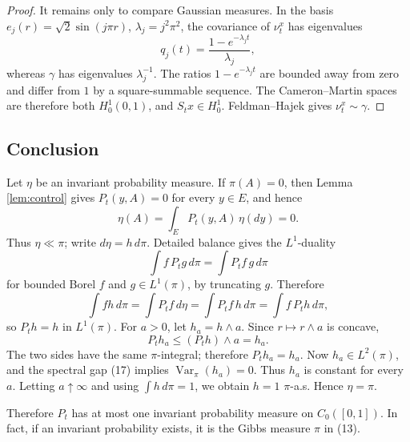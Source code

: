 \documentclass[12pt]{article}
\newcommand{\1}{\mathbf 1}
\newcommand{\Var}{\operatorname{Var}}
\begin{document}
\begin{proof}
It remains only to compare Gaussian measures.  In the basis
\(e_j(r)=\sqrt2\sin(j\pi r)\), \(\lambda_j=j^2\pi^2\), the covariance of
\(\nu_t^x\) has eigenvalues
\[
        q_j(t)=\frac{1-e^{-\lambda_jt}}{\lambda_j},
\]
whereas \(\gamma\) has eigenvalues \(\lambda_j^{-1}\).  The ratios
\(1-e^{-\lambda_jt}\) are bounded away from zero and differ from \(1\) by a
square-summable sequence.  The Cameron--Martin spaces are therefore both
\(H^1_0(0,1)\), and \(S_tx\in H^1_0\).  Feldman--Hajek gives
\(\nu_t^x\sim\gamma\).
\end{proof}

\subsection*{Conclusion}

Let \(\eta\) be an invariant probability measure.  If \(\pi(A)=0\), then
Lemma \ref{lem:control} gives \(P_t(y,A)=0\) for every \(y\in E\), and hence
\[
        \eta(A)=\int_E P_t(y,A)\,\eta(dy)=0.
\]
Thus \(\eta\ll\pi\); write \(d\eta=h\,d\pi\).  Detailed balance gives the
\(L^1\)-duality
\[
        \int f\,P_t g\,d\pi=\int P_t f\,g\,d\pi
\]
for bounded Borel \(f\) and \(g\in L^1(\pi)\), by truncating \(g\).  Therefore
\[
 \int f h\,d\pi=\int P_tf\,d\eta
      =\int P_tf\,h\,d\pi=\int f\,P_t h\,d\pi ,
\]
so \(P_t h=h\) in \(L^1(\pi)\).  For \(a>0\), let \(h_a=h\wedge a\).  Since
\(r\mapsto r\wedge a\) is concave,
\[
        P_t h_a\le (P_t h)\wedge a=h_a .
\]
The two sides have the same \(\pi\)-integral; therefore \(P_t h_a=h_a\).
Now \(h_a\in L^2(\pi)\), and the spectral gap (17) implies
\(\Var_\pi(h_a)=0\).  Thus \(h_a\) is constant for every \(a\).  Letting
\(a\uparrow\infty\) and using \(\int h\,d\pi=1\), we obtain \(h=1\)
\(\pi\)-a.s.  Hence \(\eta=\pi\).

Therefore \(P_t\) has at most one invariant probability measure on
\(C_0([0,1])\).  In fact, if an invariant probability exists, it is the Gibbs
measure \(\pi\) in (13).
\end{document}
